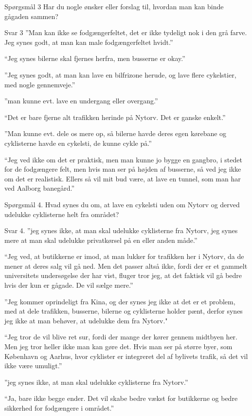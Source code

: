 \begin{appendics}
Spørgsmål 3
Har du nogle ønsker eller forslag til, hvordan man kan binde gågaden sammen?

Svar 3
”Man kan ikke se fodgængerfeltet, det er ikke tydeligt nok i den grå farve. Jeg synes godt, at man kan male fodgængerfeltet hvidt.”

“Jeg synes bilerne skal fjernes herfra, men busserne er okay.”

”Jeg synes godt, at man kan lave en bilfrizone herude, og lave flere cykelstier, med nogle gennemveje.”

”man kunne evt. lave en undergang eller overgang.”

“Det er bare fjerne alt trafikken herinde på Nytorv. Det er ganske enkelt.”

”Man kunne evt. dele os mere op, så bilerne havde deres egen kørebane og cyklisterne havde en cykelsti, de kunne cykle på.”

“Jeg ved ikke om det er praktisk, men man kunne jo bygge en gangbro, i stedet for de fodgængere felt, men hvis man ser på højden af busserne, så ved jeg ikke om det er realistisk. Ellers så vil mit bud være, at lave en tunnel, som man har ved Aalborg banegård.”

Spørgsmål 4.
Hvad synes du om, at lave en cykelsti uden om Nytorv og derved udelukke cyklisterne helt fra området?

Svar 4.
”jeg synes ikke, at man skal udelukke cyklisterne fra Nytorv, jeg synes mere at man skal udelukke privatkørsel på en eller anden måde.”

“Jeg ved, at butikkerne er imod, at man lukker for trafikken her i Nytorv, da de mener at deres salg vil gå ned. Men det passer altså ikke, fordi der er et gammelt universitets undersøgelse der har vist, fluger tror jeg, at det faktisk vil gå bedre hvis der kun er gågade. De vil sælge mere.”

”Jeg kommer oprindeligt fra Kina, og der synes jeg ikke at det er et problem, med at dele trafikken, busserne, bilerne og cyklisterne holder pænt, derfor synes jeg ikke at man behøver, at udelukke dem fra Nytorv."

“Jeg tror de vil blive ret sur, fordi der mange der kører gennem midtbyen her. Men jeg tror heller ikke man kan gøre det. Hvis man ser på større byer, som København og Aarhus, hvor cyklister er integreret del af bylivets trafik, så det vil ikke være umuligt.”

”jeg synes ikke, at man skal udelukke cyklisterne fra Nytorv.”

“Ja, bare ikke begge ender. Det vil skabe bedre vækst for butikkerne og bedre sikkerhed for fodgængere i området.”


\end{appendics}
